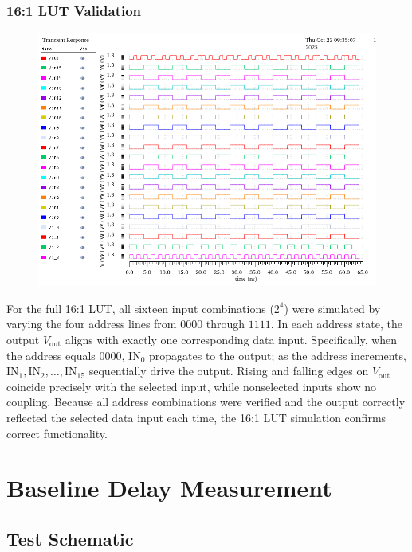 \documentclass[12pt]{article}
\begin{document}
\newpage

\subsubsection*{16:1 LUT Validation}
\begin{figure}[H]
    \centering
    \includegraphics[width=\linewidth]{writeup//figures/lutval.png}
    \caption{}
\end{figure}

For the full 16:1 LUT, all sixteen input combinations (\(2^4\)) were simulated by varying the four address lines from \(0000\) through \(1111\). 
In each address state, the output \(V_{\text{out}}\) aligns with exactly one corresponding data input. 
Specifically, when the address equals \(0000\), \(\text{IN}_0\) propagates to the output; as the address increments, \(\text{IN}_1, \text{IN}_2, \ldots, \text{IN}_{15}\) sequentially drive the output. 
Rising and falling edges on \(V_{\text{out}}\) coincide precisely with the selected input, while nonselected inputs show no coupling. 
Because all address combinations were verified and the output correctly reflected the selected data input each time, the 16:1 LUT simulation confirms correct functionality.

\newpage

\section{Baseline Delay Measurement}
\subsection{Test Schematic}
\end{document}

